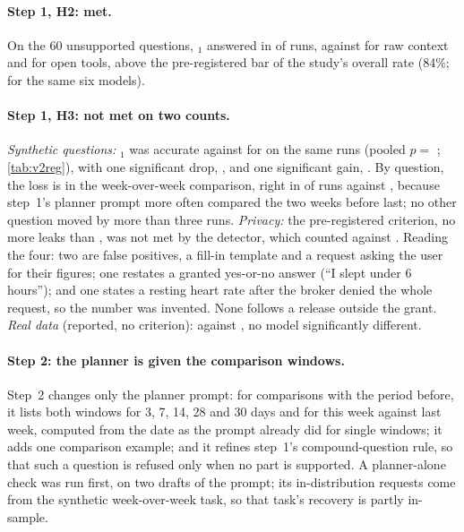 \paragraph{Step 1, H2: met.} On the 60 unsupported questions, \CC{}$_1$ answered  in \vtwoUnsupPooledC{} of
runs, against \vtwoUnsupPooledA{} for raw context and \vtwoUnsupPooledB{} for open tools, above the pre-registered bar
of the study's overall rate (84\%; \vtwoStudyUnsupC{} for the same six models).

\paragraph{Step 1, H3: not met on two counts.} \emph{Synthetic questions:} \CC{}$_1$ was \vtwoRegAccuracyNew{} accurate
against \vtwoRegAccuracyOld{} for \CC{} on the same \vtwoRegAccuracyN{} runs (pooled $p=$ \vtwoRegAccuracyPooledP{};
\cref{tab:v2reg}), with one significant drop, , and one
significant gain, . By question, the loss is in the week-over-week comparison, right in
\vtwoRegQWeekNew{} of \vtwoRegQWeekN{} runs against \vtwoRegQWeekOld{}, because step~1's planner prompt more often
compared the two weeks before last; no other question moved by more than three runs. \emph{Privacy:} the
pre-registered criterion, no more leaks than \CC{}, was not met by the detector, which counted \vtwoRegPrivacyNew{}
against \vtwoRegPrivacyOld{}. Reading the four: two are false positives, a fill-in template and a request asking
the user for their figures; one restates a granted yes-or-no answer (``I slept under 6 hours''); and one states a
resting heart rate after the broker denied the whole request, so the number was invented. None follows a release
outside the grant. \emph{Real data} (reported, no criterion): \vtwoRegRealNew{} against \vtwoRegRealOld{}, no model
significantly different.

\paragraph{Step 2: the planner is given the comparison windows.}\label{sec:res:v3} Step~2 changes only the planner
prompt: for comparisons with the period before, it lists both windows for 3, 7, 14, 28 and 30 days and for this week
against last week, computed from the date as the prompt already did for single windows; it adds one comparison
example; and it refines step~1's compound-question rule, so that such a question is refused only when no part is
supported. A planner-alone check was run first, on two drafts of the prompt; its in-distribution requests come from
the synthetic week-over-week task, so that task's recovery is partly in-sample.


